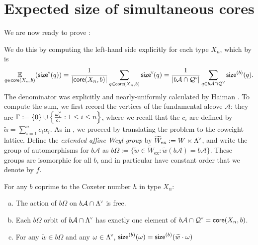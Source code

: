 \documentclass[ALCO,published]{cedram}
\newcommand{\darkblue}{\color{darkblue}} %
\newcommand{\defn}[1]{\emph{\darkblue #1}}
\newcommand{\chk}[1]{#1^{\normalfont\smash{\scalebox{.5}[.5]{\rotatebox{90}{\textbf{\textless}}}}}}
\newcommand{\Expt}[2]{\operatorname*{\mathbb{E}}\limits_{#1}(#2)}
\newcommand{\wa}{\widetilde{W}}
\newcommand{\Q}{\mathcal{Q}}
\newcommand{\ac}{\mathcal{A}}
\newcommand{\cw}{\chk{\omega}}
\newcommand{\core}{{\sf core}}
\newcommand{\cwl}{\chk{\Lambda}}
\newcommand{\wex}{\wa_{\mathrm{ex}}}
\newcommand{\cycl}{\Omega}
\newcommand{\waf}{\widetilde{w}}
\newcommand{\wf}{\waf_{\rat}}
\newcommand{\size}{{\sf size}}
\newcommand{\sizeb}{\size^{(b)}}
\newcommand{\rat}{b}
\begin{document}
\section{Expected size of simultaneous cores}
\label{sec:expectation}

We are now ready to prove :

\mainthm*

We do this by computing the left-hand side explicitly for each type $X_n$, which by  is
\begin{equation*}
    \Expt{q \in \core(X_n,b)}{\chk{\size}(q)} 
    = \frac{1}{|\core(X_n,b)|}\sum_{q\in \core(X_n,b)} \chk{\size}(q) = \frac{1}{|b\ac\cap\chk{\Q}|}\sum_{q\in b\ac\cap\chk{\Q}} \sizeb(q).
\end{equation*} 
The denominator was explicitly and nearly-uniformly calculated by Haiman \cite{haiman1994conjectures}. To compute the sum, we first record the vertices of the fundamental alcove $\ac$: they are \(\Gamma:=\{0\}\cup\left\{\frac{\cw_i}{c_i} : 1 \leq i \leq n\right\}\), where we recall that the $c_i$ are defined by $\widetilde{\alpha}=\sum_{i=1}^nc_i\alpha_i$.  As in \cite{thiel2017strange}, we proceed by translating the problem to the coweight lattice.  Define the \defn{extended affine Weyl group} by $\wex:=W\ltimes \cwl$, and write the group of automorphisms for $b\ac$ as $b\cycl:=\{\waf\in\wex:\waf(b\ac)=b\ac\}$. These groups are isomorphic for all $b$, and in particular have constant order that we denote by $f$.

\begin{prop}
For any $b$ coprime to the Coxeter number $h$ in type $X_n$:
	\begin{enumerate}[(a)]
	\item The action of $b\cycl$ on $b\ac\cap\cwl$ is free.
	\item Each $b\cycl$ orbit of $b\ac\cap\cwl$ has exactly one element of $b\ac\cap\chk{\Q}=\core(X_n,b)$.
	\item For any $\waf\in b\cycl$ and any $\omega\in\cwl$, $\size^{(b)}(\omega)=\size^{(b)}(\waf\cdot\omega)$
	\end{enumerate}
\label{prop:barational}
\end{prop}
\end{document}
